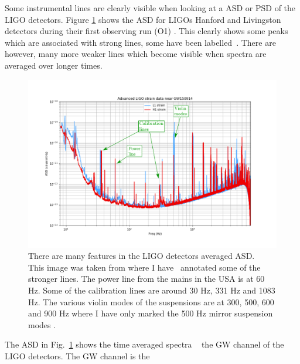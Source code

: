 Some instrumental lines are clearly visible when looking at a \gls{ASD} or
\gls{PSD} of the \gls{LIGO} detectors. Figure \ref{detchar:line:psd} shows the
\gls{ASD} for \glspl{LIGO} Hanford and Livingston detectors during their first
observing run (O1) \citep{GWOpen}. This clearly shows some peaks which are
associated with strong lines, some have been labelled~. There are however, many
more weaker lines which become visible when spectra are averaged over longer
times.
%
\begin{figure} \centering
\includegraphics[width=\textwidth]{C5_detchar/ligo_o1_asd_annot.pdf}
\caption[Strain \gls{ASD} for the \gls{LIGO} detectors.]{There are many
features in the \gls{LIGO} detectors averaged \gls{ASD}.~ This image was taken
from \citep{GWOpen} where I have~ annotated some of the stronger lines. The
power line from the mains in the USA is at 60 Hz. Some of the calibration lines
are around 30 Hz, 331 Hz and 1083 Hz. The various violin modes of the
suspensions are at 300, 500, 600 and 900 Hz where I have only marked the 500 Hz
mirror suspension modes \citep{GWOpen}.} \label{detchar:line:psd} \end{figure}
%
The \gls{ASD} in Fig.~\ref{detchar:line:psd} shows the time averaged spectra
~ the \gls{GW} channel of the \gls{LIGO} detectors.  The \gls{GW} channel is the

